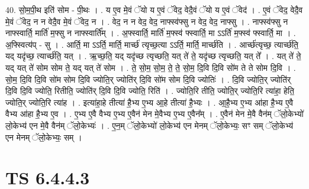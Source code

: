 \documentclass[17pt]{extarticle}
\begin{document}
40. सो॒म॒पी॒थ इति॑ सोम - पी॒थः । . य ए॒व मे॒वं ॅयो य ए॒वं ॅवेद॒ वेदै॒वं ॅयो य ए॒वं ॅवेद॑ । . ए॒वं ॅवेद॒ वेदै॒व मे॒वं ॅवेद॒ न न वेदै॒व मे॒वं ॅवेद॒ न । . वेद॒ न न वेद॒ वेद॒ नाफ्स्व॑फ्सु न वेद॒ वेद॒ नाफ्सु । . नाफ्स्व॑फ्सु न नाफ्स्वार्ति॒ मार्ति॑ म॒फ्सु न नाफ्स्वार्ति᳚म् । . अ॒फ्स्वार्ति॒ मार्ति॑ म॒फ्स्व॑ फ्स्वार्ति॒ मा ऽऽर्ति॑ म॒फ्स्व॑ फ्स्वार्ति॒ मा । . अ॒फ्स्वित्य॑प् - सु । . आर्ति॒ मा ऽऽर्ति॒ मार्ति॒ मार्च्छ॑ त्यृच्छ॒त्या ऽऽर्ति॒ मार्ति॒ मार्च्छ॑ति । . आर्च्छ॑त्यृच्छ॒ त्यार्च्छ॑ति॒ यद् यदृ॑च्छ॒ त्यार्च्छ॑ति॒ यत् । . ऋ॒च्छ॒ति॒ यद् यदृ॑च्छ त्यृच्छति॒ यत् ते॑ ते॒ यदृ॑च्छ त्यृच्छति॒ यत् ते᳚ । . यत् ते॑ ते॒ यद् यत् ते॑ सोम सोम ते॒ यद् यत् ते॑ सोम । . ते॒ सो॒म॒ सो॒म॒ ते॒ ते॒ सो॒म॒ दि॒वि दि॒वि सो॑म ते ते सोम दि॒वि । . सो॒म॒ दि॒वि दि॒वि सो॑म सोम दि॒वि ज्योति॒र् ज्योति॑र् दि॒वि सो॑म सोम दि॒वि ज्योतिः॑ । . दि॒वि ज्योति॒र् ज्योति॑र् दि॒वि दि॒वि ज्योति॒ रितीति॒ ज्योति॑र् दि॒वि दि॒वि ज्योति॒ रिति॑ । . ज्योति॒रि तीति॒ ज्योति॒र् ज्योति॒रि त्या॑हा॒ हेति॒ ज्योति॒र् ज्योति॒रि त्या॑ह । . इत्या॑हा॒हे तीत्या॑ है॒भ्य ए॒भ्य आ॒हे तीत्या॑ है॒भ्यः । . आ॒है॒भ्य ए॒भ्य आ॑हा है॒भ्य ए॒वै वैभ्य आ॑हा है॒भ्य ए॒व । . ए॒भ्य ए॒वै वैभ्य ए॒भ्य ए॒वैन॑ मेन मे॒वैभ्य ए॒भ्य ए॒वैन᳚म् । . ए॒वैन॑ मेन मे॒वै वैन॑म् ॅलो॒केभ्यो॑ लो॒केभ्य॑ एन मे॒वै वैन॑म् ॅलो॒केभ्यः॑ । . ए॒न॒म् ॅलो॒केभ्यो॑ लो॒केभ्य॑ एन मेनम् ॅलो॒केभ्यः॒ सꣳ सम् ॅलो॒केभ्य॑ एन मेनम् ॅलो॒केभ्यः॒ सम् । \newline
\pagebreak
{}

\section{ TS 6.4.4.3 }
\end{document}
